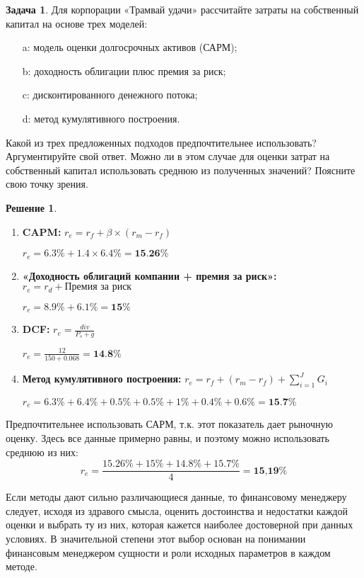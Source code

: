 \documentclass[a4paper, 14pt]{article}
\theoremstyle{plain} %
\theoremstyle{definition} %
\newtheorem*{solution}{Решение}
\newtheorem{problem}{Задача}[subsection]
\theoremstyle{remark} %
\begin{document}
\begin{problem}
		Для корпорации «Трамвай удачи» рассчитайте затраты на собственный капитал на основе трех моделей:
		\begin{itemize}
			\item[a:] модель оценки долгосрочных активов (САРМ);
			\item[b:] доходность облигации плюс премия за риск;
			\item[c:] дисконтированного денежного потока;
			\item[d:] метод кумулятивного построения.
		\end{itemize}
		Какой  из  трех  предложенных  подходов  предпочтительнее  использовать? Аргументируйте свой ответ. Можно ли в этом случае для оценки затрат на собственный капитал использовать среднюю из полученных значений? Поясните свою точку зрения.
	\begin{solution}
	\end{solution}
		\begin{enumerate}
			\item \textbf{CAPM:} $r_{e} = r_{f} + \beta \times (r_{m} - r_{f})$

			$r_{e} = 6.3\% + 1.4 \times 6.4\% = \textbf{15.26\%}$
			\item \textbf{«Доходность облигаций компании + премия за риск»:} $r_{e} = r_{d} + \textit{Премия за риск}$

			$r_{e} = 8.9\% + 6.1\% = \textbf{15\%}$
			\item \textbf{DCF:} $r_{e} = \frac{div}{P_{s}+g} $

			$r_{e} = \frac{12}{150+0.068} = \textbf{14.8\%} $
			\item \textbf{Метод кумулятивного построения:} $r_{e} = r_{f} + (r_{m} - r_{f}) + \sum_{i=1}^J G_{i}$

			$r_{e} = 6.3\% + 6.4\% + 0.5\% + 0.5\% + 1\% + 0.4\% + 0.6\% = \textbf{15.7\%}$
		\end{enumerate}

		Предпочтительнее использовать САРМ, т.к. этот показатель дает рыночную оценку. Здесь все данные примерно равны, и поэтому можно использовать среднюю из них:
		\[r_{e} = \frac{15.26\% + 15\% + 14.8\% + 15.7\%}{4} = \textbf{15,19\%}\]

		Если методы дают сильно различающиеся данные, то финансовому менеджеру следует, исходя из здравого смысла, оценить достоинства и недостатки каждой оценки и выбрать ту из них, которая кажется наиболее достоверной при данных условиях. В значительной степени этот выбор основан на понимании финансовым менеджером сущности и роли исходных параметров в каждом методе.
\end{problem}
\end{document}
